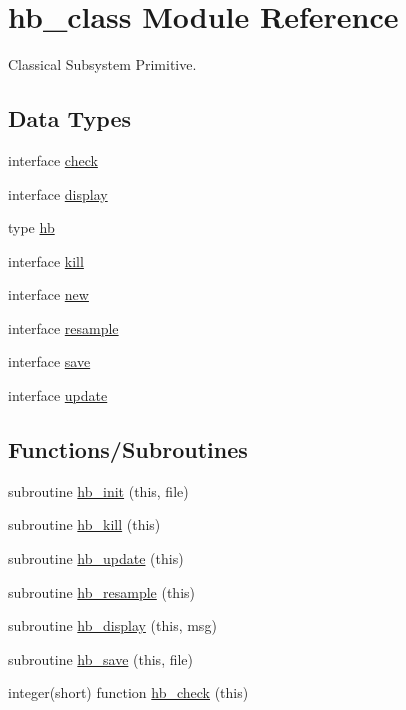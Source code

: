 \hypertarget{namespacehb__class}{}\section{hb\+\_\+class Module Reference}
\label{namespacehb__class}


Classical Subsystem Primitive.  


\subsection*{Data Types}
\begin{DoxyCompactItemize}
\item 
interface \hyperlink{interfacehb__class_1_1check}{check}
\item 
interface \hyperlink{interfacehb__class_1_1display}{display}
\item 
type \hyperlink{structhb__class_1_1hb}{hb}
\item 
interface \hyperlink{interfacehb__class_1_1kill}{kill}
\item 
interface \hyperlink{interfacehb__class_1_1new}{new}
\item 
interface \hyperlink{interfacehb__class_1_1resample}{resample}
\item 
interface \hyperlink{interfacehb__class_1_1save}{save}
\item 
interface \hyperlink{interfacehb__class_1_1update}{update}
\end{DoxyCompactItemize}
\subsection*{Functions/\+Subroutines}
\begin{DoxyCompactItemize}
\item 
subroutine \hyperlink{namespacehb__class_aad89f206670f2c2396f92abf66cf9c1d}{hb\+\_\+init} (this, file)
\item 
subroutine \hyperlink{namespacehb__class_a696c9e145feab6ab780338ffcf6d6d4b}{hb\+\_\+kill} (this)
\item 
subroutine \hyperlink{namespacehb__class_a03d6e94665987e6ce2a283953632fb3f}{hb\+\_\+update} (this)
\item 
subroutine \hyperlink{namespacehb__class_a9d6faaa888c003d629e1b35f8b510832}{hb\+\_\+resample} (this)
\item 
subroutine \hyperlink{namespacehb__class_a8d8a7109913e9189fbc950d34378727b}{hb\+\_\+display} (this, msg)
\item 
subroutine \hyperlink{namespacehb__class_a53b39344e155580d8d2161a497774364}{hb\+\_\+save} (this, file)
\item 
integer(short) function \hyperlink{namespacehb__class_a84c1c4284b5897ff912c8c1671b6775f}{hb\+\_\+check} (this)
\end{DoxyCompactItemize}


